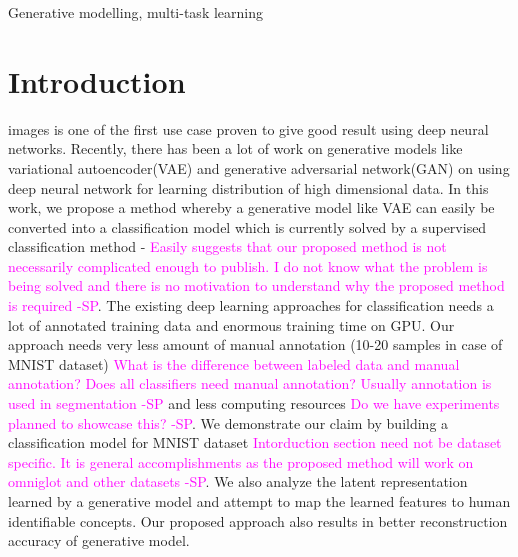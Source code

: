 \documentclass[journal]{IEEEtran}
\newcommand{\snote}[1]{\textcolor{magenta}{#1 -SP}}
\begin{document}
\begin{IEEEkeywords}
Generative modelling, multi-task learning
\end{IEEEkeywords}


%
\IEEEpeerreviewmaketitle


\section{Introduction}
% 
% 
% 
% 
 images is one of the first use case proven to give good result using deep neural networks. Recently, there has been a lot of work on generative models like variational autoencoder(VAE)\cite{vae} and generative adversarial network(GAN) \cite{gan} on using deep neural network for learning distribution of high dimensional data. In this work, we propose a method whereby a generative model like VAE can easily be converted into a classification model which is currently solved by a supervised classification method - \snote{Easily suggests that our proposed method is not necessarily complicated enough to publish. I do not know what the problem is being solved and there is no motivation to understand why the proposed method is required}. The existing deep learning approaches for classification  needs a lot of annotated training data and enormous training time on GPU\cite{alexnet}\cite{vggnet}\cite{resnet}.  Our approach needs very less amount of manual annotation (10-20 samples in case of MNIST dataset) \snote{What is the difference between labeled data and manual annotation? Does all classifiers need manual annotation? Usually annotation is used in segmentation} and less computing resources \snote{Do we have experiments planned to showcase this?}. We demonstrate our claim by building a classification model for MNIST dataset \snote{Intorduction section need not be dataset specific. It is general accomplishments as the proposed method will work on omniglot and other datasets}.  We also analyze the latent representation learned by a generative model and attempt to map the learned features to human identifiable concepts.  Our proposed approach also results in better reconstruction accuracy of generative model.
\end{document}
